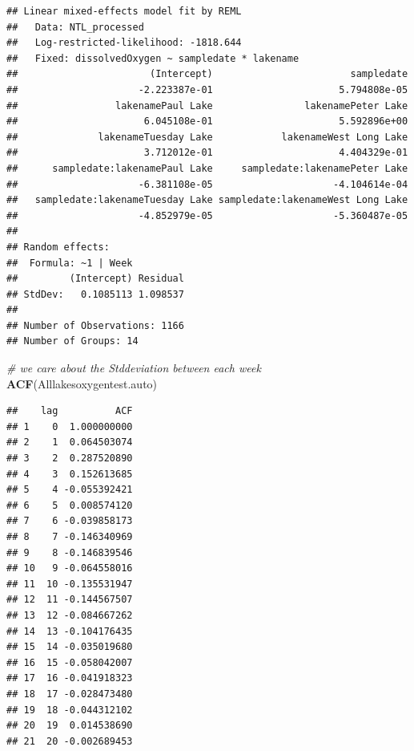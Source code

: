 \documentclass[12pt,]{article}
\newenvironment{Shaded}{\begin{snugshade}}{\end{snugshade}}
\newcommand{\KeywordTok}[1]{\textcolor[rgb]{0.13,0.29,0.53}{\textbf{#1}}}
\newcommand{\CommentTok}[1]{\textcolor[rgb]{0.56,0.35,0.01}{\textit{#1}}}
\newcommand{\NormalTok}[1]{#1}
\begin{document}
\begin{verbatim}
## Linear mixed-effects model fit by REML
##   Data: NTL_processed 
##   Log-restricted-likelihood: -1818.644
##   Fixed: dissolvedOxygen ~ sampledate * lakename 
##                       (Intercept)                        sampledate 
##                     -2.223387e-01                      5.794808e-05 
##                 lakenamePaul Lake                lakenamePeter Lake 
##                      6.045108e-01                      5.592896e+00 
##              lakenameTuesday Lake            lakenameWest Long Lake 
##                      3.712012e-01                      4.404329e-01 
##      sampledate:lakenamePaul Lake     sampledate:lakenamePeter Lake 
##                     -6.381108e-05                     -4.104614e-04 
##   sampledate:lakenameTuesday Lake sampledate:lakenameWest Long Lake 
##                     -4.852979e-05                     -5.360487e-05 
## 
## Random effects:
##  Formula: ~1 | Week
##         (Intercept) Residual
## StdDev:   0.1085113 1.098537
## 
## Number of Observations: 1166
## Number of Groups: 14
\end{verbatim}

\begin{Shaded}
\begin{Highlighting}[]
\CommentTok{# we care about the Stddeviation between each week}
\KeywordTok{ACF}\NormalTok{(Alllakesoxygentest.auto)}
\end{Highlighting}
\end{Shaded}

\begin{verbatim}
##    lag          ACF
## 1    0  1.000000000
## 2    1  0.064503074
## 3    2  0.287520890
## 4    3  0.152613685
## 5    4 -0.055392421
## 6    5  0.008574120
## 7    6 -0.039858173
## 8    7 -0.146340969
## 9    8 -0.146839546
## 10   9 -0.064558016
## 11  10 -0.135531947
## 12  11 -0.144567507
## 13  12 -0.084667262
## 14  13 -0.104176435
## 15  14 -0.035019680
## 16  15 -0.058042007
## 17  16 -0.041918323
## 18  17 -0.028473480
## 19  18 -0.044312102
## 20  19  0.014538690
## 21  20 -0.002689453
\end{verbatim}
\end{document}
